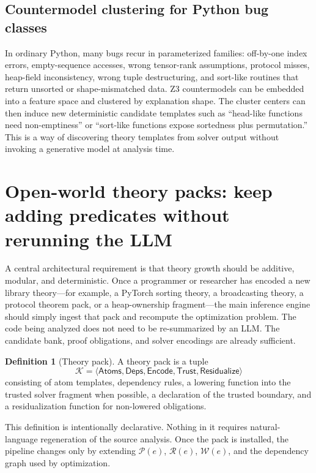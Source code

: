 \documentclass[11pt]{article}
\newcommand{\Zthree}{\textsc{Z3}}
\theoremstyle{definition}
\newtheorem{definition}{Definition}[section]
\theoremstyle{plain}
\begin{document}
\subsection{Countermodel clustering for Python bug classes}
In ordinary Python, many bugs recur in parameterized families: off-by-one index
errors, empty-sequence accesses, wrong tensor-rank assumptions, protocol misses,
heap-field inconsistency, wrong tuple destructuring, and sort-like routines that
return unsorted or shape-mismatched data. \Zthree{} countermodels can be embedded
into a feature space and clustered by explanation shape. The cluster centers can
then induce new deterministic candidate templates such as ``head-like functions
need non-emptiness'' or ``sort-like functions expose sortedness plus
permutation.'' This is a way of discovering theory templates from solver output
without invoking a generative model at analysis time.

\section{Open-world theory packs: keep adding predicates without rerunning the LLM}

A central architectural requirement is that theory growth should be additive,
modular, and deterministic. Once a programmer or researcher has encoded a new
library theory---for example, a PyTorch sorting theory, a broadcasting theory, a
protocol theorem pack, or a heap-ownership fragment---the main inference engine
should simply ingest that pack and recompute the optimization problem. The code
being analyzed does not need to be re-summarized by an LLM. The candidate bank,
proof obligations, and solver encodings are already sufficient.

\begin{definition}[Theory pack]
A theory pack is a tuple
\[
\mathcal{K} = \langle \mathsf{Atoms}, \mathsf{Deps}, \mathsf{Encode}, \mathsf{Trust}, \mathsf{Residualize} \rangle
\]
consisting of atom templates, dependency rules, a lowering function into the
trusted solver fragment when possible, a declaration of the trusted boundary, and
a residualization function for non-lowered obligations.
\end{definition}

This definition is intentionally declarative. Nothing in it requires natural-
language regeneration of the source analysis. Once the pack is installed, the
pipeline changes only by extending $\mathcal{P}(e)$, $\mathcal{R}(e)$,
$\mathcal{W}(e)$, and the dependency graph used by optimization.
\end{document}
